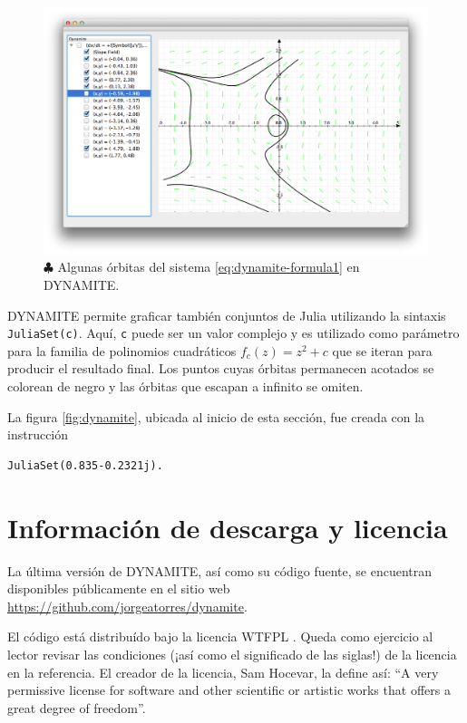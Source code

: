 \begin{figure} \centering
	\includegraphics[scale=0.4]{figures/dynamite-orbits.png}
	\caption{$\clubsuit$ Algunas órbitas del sistema \ref{eq:dynamite-formula1} en DYNAMITE.}
	\label{fig:dynamite-orbits}
\end{figure}

\newpage

\begin{example}
DYNAMITE permite graficar también conjuntos de Julia utilizando la sintaxis \texttt{JuliaSet(c)}.
Aquí, \texttt{c} puede ser un valor complejo y es utilizado como parámetro para la familia de polinomios cuadráticos $f_c(z) = z^2 + c$ que se iteran para producir el resultado final. Los puntos cuyas órbitas permanecen acotados se colorean de negro y las órbitas que escapan a infinito se omiten.

La figura \ref{fig:dynamite}, ubicada al inicio de esta sección, fue creada con la instrucción \begin{verbatim}JuliaSet(0.835-0.2321j).\end{verbatim}
\end{example}

\section{Información de descarga y licencia}

La última versión de DYNAMITE, así como su código fuente, se encuentran disponibles públicamente en el sitio web \url{https://github.com/jorgeatorres/dynamite}.

El código está distribuído bajo la licencia WTFPL \cite{wtfpl}. Queda como ejercicio al lector revisar las condiciones (¡así como el significado de las siglas!) de la licencia en la referencia. El creador de la licencia, Sam Hocevar, la define así: ``A very permissive license for software and other scientific or artistic works that offers a great degree of freedom''.